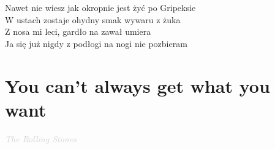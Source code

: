\documentclass[a5paper, 10pt]{book}
\begin{document}
\begin{minipage}[t]{0.85\textwidth}
\hspace*{6mm}Nawet nie wiesz jak okropnie jest żyć po Gripeksie       \\
\hspace*{6mm}W ustach zostaje ohydny smak wywaru z żuka           \\
\hspace*{6mm}Z nosa mi leci, gardło na zawał umiera                 \\
\hspace*{6mm}Ja się już nigdy z podłogi na nogi nie pozbieram \\

\end{minipage}



\newpage
\section{You can't always get what you want}\textcolor{lightgray}{\textit{The Rolling Stones}}\\~\\
\end{document}
